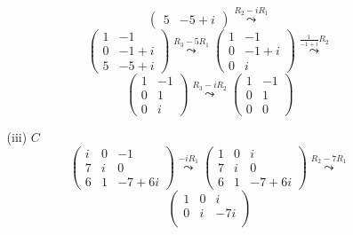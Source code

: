 \documentclass[a4paper]{article}
\theoremstyle{break}
\theoremstyle{break}
\theoremstyle{break}
\theoremstyle{break}
\begin{document}
\begin{enumerate}
\begin{enumerate}
\[\begin{pmatrix}
				            5 & -5 +i
			            \end{pmatrix}
			            \stackrel{R_2 - iR_1}{\leadsto}
		            \]
		            \[
			            \begin{pmatrix}
				            1 & -1     \\
				            0 & -1 + i \\
				            5 & -5 +i
			            \end{pmatrix}
			            \stackrel{R_3 - 5R_1}{\leadsto}
			            \begin{pmatrix}
				            1 & -1    \\
				            0 & -1 +i \\
				            0 & i
			            \end{pmatrix}
			            \stackrel{\frac{1}{-1+i}R_2}{\leadsto}
		            \]
		            \[
			            \begin{pmatrix}
				            1 & -1 \\
				            0 & 1  \\
				            0 & i
			            \end{pmatrix}
			            \stackrel{R_3 - iR_2}{\leadsto}
			            \begin{pmatrix}
				            1 & -1 \\
				            0 & 1  \\
				            0 & 0
			            \end{pmatrix}
		            \]
		      \item[(iii)] \( C \)
		            \[
			            \begin{pmatrix}
				            i & 0 & -1      \\
				            7 & i & 0       \\
				            6 & 1 & -7 + 6i
			            \end{pmatrix}
			            \stackrel{-iR_1}{\leadsto}
			            \begin{pmatrix}
				            1 & 0 & i       \\
				            7 & i & 0       \\
				            6 & 1 & -7 + 6i
			            \end{pmatrix}
			            \stackrel{R_2 -7R_1}{\leadsto}
		            \]
		            \[
			            \begin{pmatrix}
				            1 & 0 & i       \\
				            0 & i & -7i     \\

\end{pmatrix}\]
\end{enumerate}
\end{enumerate}
\end{document}
